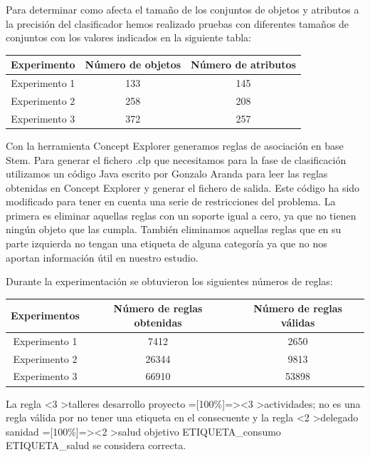 Para determinar como afecta el tamaño de los conjuntos de objetos y atributos a la precisión del clasificador hemos realizado pruebas con diferentes tamaños de conjuntos con los valores indicados en la siguiente tabla:
\vspace{1em}
\begin{center}

\begin{tabular}{|c|c|c|}
  \hline 
  Experimento & Número de objetos & Número de atributos \\ 
  \hline 
  Experimento 1 & 133 & 145 \\ 
  \hline 
  Experimento 2 & 258 & 208 \\ 
  \hline 
  Experimento 3 & 372 & 257 \\ 
  \hline 
  \end{tabular}   
  
\end{center}
\vspace{1em}

Con la herramienta Concept Explorer generamos reglas de asociación en base Stem. Para generar el fichero .clp que necesitamos para la fase de clasificación utilizamos un código Java escrito por Gonzalo Aranda para leer las reglas obtenidas en Concept Explorer y generar el fichero de salida. Este código ha sido modificado para tener en cuenta una serie de restricciones del problema. La primera es eliminar aquellas reglas con un soporte igual a cero, ya que no tienen ningún objeto que las cumpla. También eliminamos aquellas reglas que en su parte izquierda no tengan una etiqueta de alguna categoría ya que no nos aportan información útil en nuestro estudio.

Durante la experimentación se obtuvieron los siguientes números de reglas:

\vspace{1em}
\begin{tabular}{|c|c|c|}
\hline 
Experimentos & Número de reglas obtenidas & Número de reglas válidas \\ 
\hline 
Experimento 1 & 7412 & 2650 \\ 
\hline 
Experimento 2 & 26344 & 9813 \\ 
\hline 
Experimento 3 & 66910 & 53898 \\ 
\hline 
\end{tabular} 
\vspace{1em} 

La regla \textless 3 \textgreater talleres desarrollo proyecto =[100\%]=\textgreater \textless 3 \textgreater actividades; no es una regla válida por no tener una etiqueta en el consecuente y la regla \textless 2 \textgreater delegado sanidad =[100\%]=\textgreater \textless 2 \textgreater salud objetivo ETIQUETA\_consumo ETIQUETA\_salud se considera correcta.

